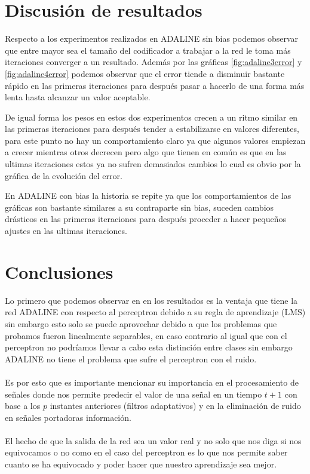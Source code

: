 \documentclass[12pt, titlepage]{article}
\begin{document}
    \section{Discusión de resultados}
    Respecto a los experimentos realizados en ADALINE sin bias podemos observar que entre mayor sea el tamaño del codificador a trabajar a la red le toma más iteraciones converger a un resultado. Además por las gráficas \ref{fig:adaline3error} y \ref{fig:adaline4error} podemos observar que el error tiende a disminuir bastante rápido en las primeras iteraciones para después pasar a hacerlo de una forma más lenta hasta alcanzar un valor aceptable.
    
    De igual forma los pesos en estos dos experimentos crecen a un ritmo similar en las primeras iteraciones para después tender a estabilizarse en valores diferentes, para este punto no hay un comportamiento claro ya que algunos valores empiezan a crecer mientras otros decrecen pero algo que tienen en común es que en las ultimas iteraciones estos ya no sufren demasiados cambios lo cual es obvio por la gráfica de la evolución del error.
    
    En ADALINE con bias la historia se repite ya que los comportamientos de las gráficas son bastante similares a su contraparte sin bias, suceden cambios drásticos en las primeras iteraciones para después proceder a hacer pequeños ajustes en las ultimas iteraciones.
    \newpage
    \section{Conclusiones}
    Lo primero que podemos observar en en los resultados es la ventaja que tiene la red ADALINE con respecto al perceptron debido a su regla de aprendizaje (LMS) sin embargo esto solo se puede aprovechar debido a que los problemas que probamos fueron linealmente separables, en caso contrario al igual que con el perceptron no podríamos llevar a cabo esta distinción entre clases sin embargo ADALINE no tiene el problema que sufre el perceptron con el ruido.
    \\\\
    Es por esto que es importante mencionar su importancia en el procesamiento de señales donde nos permite predecir el valor de una señal en un tiempo $t+1$ con base a los $p$ instantes anteriores (filtros adaptativos) y en la eliminación de ruido en señales portadoras información.
    \\\\
    El hecho de que la salida de la red sea un valor real y no solo que nos diga si nos equivocamos o no como en el caso del perceptron es lo que nos permite saber cuanto se ha equivocado y poder hacer que nuestro aprendizaje sea mejor.
    
\end{document}
